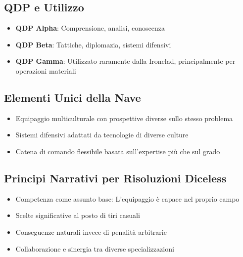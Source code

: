 \documentclass[letterpaper,twocolumn,openany,nodeprecatedcode]{dndbook}
\begin{document}
\subsection{QDP e Utilizzo}

\begin{itemize}
    \item \textbf{QDP Alpha}: Comprensione, analisi, conoscenza
    \item \textbf{QDP Beta}: Tattiche, diplomazia, sistemi difensivi
    \item \textbf{QDP Gamma}: Utilizzato raramente dalla Ironclad, principalmente per operazioni materiali
\end{itemize}

\subsection{Elementi Unici della Nave}

\begin{itemize}
    \item Equipaggio multiculturale con prospettive diverse sullo stesso problema
    \item Sistemi difensivi adattati da tecnologie di diverse culture
    \item Catena di comando flessibile basata sull'expertise più che sul grado
\end{itemize}

\subsection{Principi Narrativi per Risoluzioni Diceless}

\begin{itemize}
    \item Competenza come assunto base: L'equipaggio è capace nel proprio campo
    \item Scelte significative al posto di tiri casuali
    \item Conseguenze naturali invece di penalità arbitrarie
    \item Collaborazione e sinergia tra diverse specializzazioni
\end{itemize}
\end{document}
